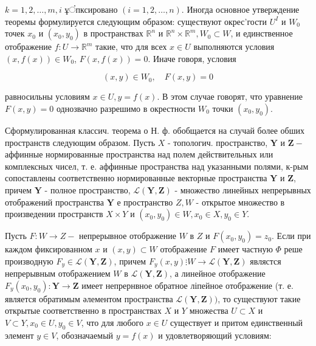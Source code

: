 \documentclass[10pt]{article}
\begin{document}
$k=1,2, \ldots, m, i$ ұंпксировано $(i=1,2, \ldots, n)$. Иногда основное утверждение теоремы формулируется следующим образом: существуют окрес'гости $U^{I}$ и $W_{0}$ точек $x_{0}$ и $\left(x_{0}, y_{0}\right)$ в пространствах $\mathbb{R}^{n}$ и $\mathbb{R}^{n} \times \mathbb{R}^{m}, W_{0} \subset W$, и единственное отображение $f: U \rightarrow \mathbb{R}^{m}$ такие, что для всех $x \in U$ выполняются условия $(x, f(x)) \in W_{0}$, $F(x, f(x))=0$. Иначе говоря, условия



\[

(x, y) \in W_{0}, \quad F(x, y)=0

\]



равносильны условиям $x \in U, y=f(x)$. В этом случае говорят, что уравнение $F(x, y)=0$ однозвачно разрешимо в окрестности $W_{0}$ точки $\left(x_{0}, y_{0}\right)$.



Сформулированная классич. теорема о Н. ф. обобщается на случай более обших пространств следующим образом. Пусть $X$ - топологич. пространство, $\boldsymbol{Y}$ и $\boldsymbol{Z}-$ аффинные нормированные пространства над полем действительных или комплексных чисел, т. е. аффинные пространства над указанными полями, к-рым сопоставлены соответственно нормированные векторные пространства $\boldsymbol{Y}$ и $\boldsymbol{Z}$, причем $\boldsymbol{Y}$ - полное пространство, $\mathscr{L}(\boldsymbol{Y}, \boldsymbol{Z})$ - множество линейных непрерывных отображений пространства $\boldsymbol{Y}$ е пространство $Z, W$ - открытое множество в произведении пространств $X \times Y$ и $\left(x_{0}, y_{0}\right) \in W, x_{0} \in X, y_{0} \in Y$.



Пусть $F: W \rightarrow Z-$ непрерывное отображение $W$ в $Z$ и $F\left(x_{0}, y_{0}\right)=z_{0}$. Если при каждом фиксированном $x$ и $(x, y) \subset W$ отображение $F$ имеет частную $\Phi$ реше производную $F_{y} \in \mathscr{L}(\boldsymbol{Y}, \boldsymbol{Z})$, причем $F_{y}(x, y) \vdots W \rightarrow \mathscr{L}(\boldsymbol{Y}, \boldsymbol{Z})$ являстся непрерывным отображением $W$ в $\mathscr{L}(\boldsymbol{Y}, \boldsymbol{Z})$, а линейное отображение $F_{y}\left(x_{0}, y_{0}\right): \boldsymbol{Y} \rightarrow \boldsymbol{Z}$ имеет непрернвное обратное ліпейное отображение (т. е. является обратимым әлементом пространства $\mathscr{L}(\boldsymbol{Y}, \boldsymbol{Z}))$, то существуют такие открытые соответственно в пространствах $X$ и $Y$ множества $U \subset X$ и $V \subset Y, x_{0} \in U, y_{0} \in V$, что для любого $x \in U$ существует и притом единственный элемент $y \in V$, обозначаемый $y=f(x)$ и удовлетворяющий условиям:
\end{document}
